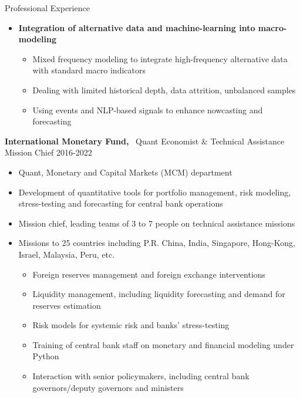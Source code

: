\documentclass[usegeometry, 10pt, a4paper]{cv} %
\newcommand{\activite}[1]{\textbf{#1}\ }
\begin{document}
\begin{rubriquetableau}[0.95\textwidth]{Professional Experience}
\begin{itemize}[label={},
rightmargin=\dimexpr\linewidth-13cm-\leftmargin\relax]
\item \textbf{Integration of alternative data and machine-learning into macro-modeling}
  \begin{itemize}
  \item Mixed frequency modeling to integrate high-frequency alternative data with standard macro indicators    
  \item Dealing with limited historical depth, data attrition, unbalanced samples
  \item Using events and NLP-based signals to enhance nowcasting and forecasting
  \end{itemize}  
 \end{itemize}
 
\end{rubriquetableau}
\clearpage
\newpage

\activite{International   Monetary  Fund,}   Quant   Economist  \&   Technical
Assistance Mission Chief \hfill 2016-2022 \\ \vspace{-0.5cm}

\begin{itemize}[label={},
rightmargin=\dimexpr\linewidth-13cm-\leftmargin\relax]
\item Quant, Monetary and Capital Markets (MCM) department
\item Development of quantitative tools for portfolio management, risk modeling, stress-testing and forecasting for central bank operations
\item Mission chief, leading teams of  3 to 7 people  on technical assistance missions
\item Missions to 25 countries including P.R. China, India, Singapore, Hong-Kong, Israel, Malaysia, Peru, etc.
  \begin{itemize}
  \item Foreign reserves management and foreign exchange interventions
  \item Liquidity management, including liquidity forecasting and demand for reserves estimation
  \item Risk models for systemic risk and banks' stress-testing
  \item Training of central bank staff on monetary and financial modeling under Python
  \item Interaction with senior policymakers, including central bank governors/deputy governors and ministers     
  \end{itemize}
 \end{itemize}
 
\end{document}
